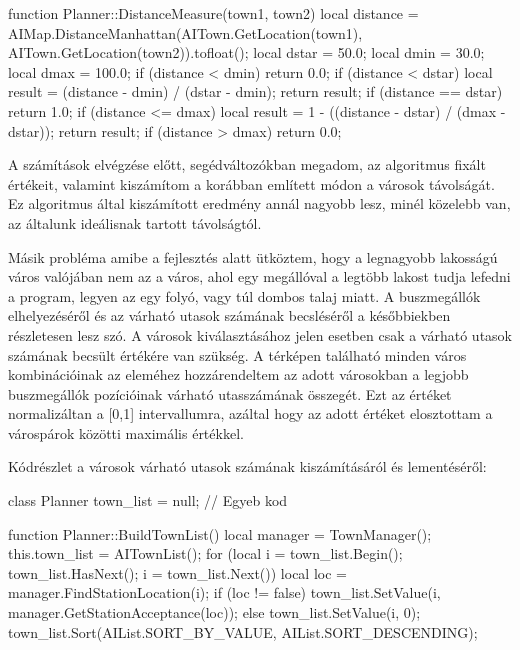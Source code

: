 \begin{cpp}
function Planner::DistanceMeasure(town1, town2)
{
  local distance = AIMap.DistanceManhattan(AITown.GetLocation(town1),
    AITown.GetLocation(town2)).tofloat();
  local dstar = 50.0;
  local dmin = 30.0;
  local dmax = 100.0;
  if (distance < dmin) {
    return 0.0;
  }
  if (distance < dstar) {
    local result = (distance - dmin) / (dstar - dmin);
    return result;
  }
  if (distance == dstar) {
    return 1.0;
  }
  if (distance <= dmax) {
    local result = 1 - ((distance - dstar) / (dmax - dstar));
    return result;
  }
  if (distance > dmax) {
    return 0.0;
  }
}
\end{cpp}

A számítások elvégzése előtt, segédváltozókban megadom, az algoritmus fixált értékeit, valamint kiszámítom a korábban említett módon a városok távolságát. Ez algoritmus által kiszámított eredmény annál nagyobb lesz, minél közelebb van, az általunk ideálisnak tartott távolságtól.

Másik probléma amibe a fejlesztés alatt ütköztem, hogy a legnagyobb lakosságú város valójában nem az a város, ahol egy megállóval a legtöbb lakost tudja lefedni a program, legyen az egy folyó, vagy túl dombos talaj miatt. A buszmegállók elhelyezéséről és az várható utasok számának becsléséről a későbbiekben részletesen lesz szó. A városok kiválasztásához jelen esetben csak a várható utasok számának becsült értékére van szükség. A térképen található minden város kombinációinak az eleméhez hozzárendeltem az adott városokban a legjobb buszmegállók pozícióinak várható utasszámának összegét. Ezt az értéket normalizáltan a [0,1] intervallumra, azáltal hogy az adott értéket elosztottam a várospárok közötti maximális értékkel.

Kódrészlet a városok várható utasok számának kiszámításáról és lementéséről:
\begin{cpp}

class Planner {
  town_list = null;
  // Egyeb kod
}

function Planner::BuildTownList()
{
  local manager = TownManager();
  this.town_list = AITownList();
  for (local i = town_list.Begin(); 
   town_list.HasNext(); i = town_list.Next()) {
    local loc = manager.FindStationLocation(i);
    if (loc != false) {
      town_list.SetValue(i, manager.GetStationAcceptance(loc));
    } else {
      town_list.SetValue(i, 0);
    }
  }
  town_list.Sort(AIList.SORT_BY_VALUE, AIList.SORT_DESCENDING);
}
\end{cpp}

